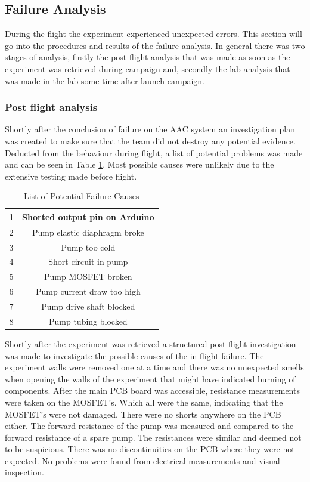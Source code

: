 \pagebreak
\subsection{Failure Analysis}\label{sec:failureanalysis}
During the flight the experiment experienced unexpected errors. This section will go into the procedures and results of the failure analysis. In general there was two stages of analysis, firstly the post flight analysis that was made as soon as the experiment was retrieved during campaign and, secondly the lab analysis that was made in the lab some time after launch campaign.

\subsubsection{Post flight analysis}
Shortly after the conclusion of failure on the AAC system an investigation plan was created to make sure that the team did not destroy any potential evidence. Deducted from the behaviour during flight, a list of potential problems was made and can be seen in Table \ref{tab:potential-failure-causes}. Most possible causes were unlikely due to the extensive testing made before flight.
\begin{table}[H]
    \centering
    \begin{tabular}{|c|c|}
    \hline
        1 & Shorted output pin on Arduino \\ \hline 
        2 & Pump elastic diaphragm broke \\ \hline 
        3 & Pump too cold \\ \hline 
        4 & Short circuit in pump\\ \hline 
        5 & Pump MOSFET broken\\ \hline 
        6 & Pump current draw too high\\ \hline 
        7 & Pump drive shaft blocked\\ \hline 
        8 & Pump tubing blocked\\ \hline 
    \end{tabular}
    \caption{List of Potential Failure Causes}
    \label{tab:potential-failure-causes}
\end{table}



Shortly after the experiment was retrieved a structured post flight investigation was made to investigate the possible causes of the in flight failure. The experiment walls were removed one at a time and there was no unexpected smells when opening the walls of the experiment that might have indicated burning of components. After the main PCB board was accessible, resistance measurements were taken on the MOSFET's. Which all were the same, indicating that the MOSFET's were not damaged. There were no shorts anywhere on the PCB either. The forward resistance of the pump was measured and compared to the forward resistance of a spare pump. The resistances were similar and deemed not to be suspicious. There was no discontinuities on the PCB where they were not expected. No problems were found from electrical measurements and visual inspection. 


